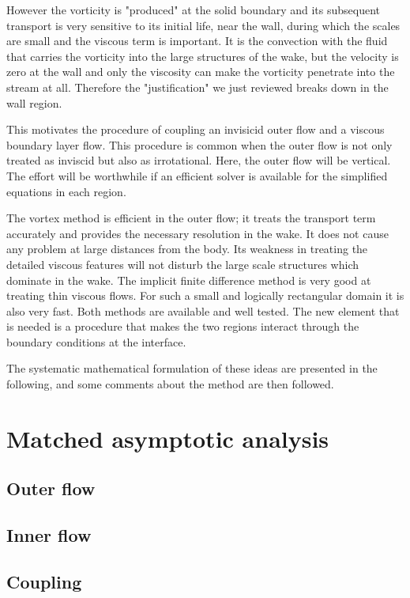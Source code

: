 However the vorticity is "produced" at the solid boundary and its subsequent transport is very sensitive to its initial life, near the wall, during which the scales are small and the viscous term is important.
It is the convection with the fluid that carries the vorticity into the large structures of the wake, but the velocity is zero at the wall and only the viscosity can make the vorticity penetrate into the stream at all.
Therefore the "justification" we just reviewed breaks down in the wall region.

This motivates the procedure of coupling an invisicid outer flow and a viscous boundary layer flow.
This procedure is common when the outer flow is not only treated as inviscid but also as irrotational.
Here, the outer flow will be vertical.
The effort will be worthwhile if an efficient solver is available for the simplified equations in each region.

The vortex method is efficient in the outer flow; it treats the transport term accurately and provides the necessary resolution in the wake.
It does not cause any problem at large distances from the body.
Its weakness in treating the detailed viscous features will not disturb the large scale structures which dominate in the wake.
The implicit finite difference method is very good at treating thin viscous flows.
For such a small and logically rectangular domain it is also very fast.
Both methods are available and well tested.
The new element that is needed is a procedure that makes the two regions interact through the boundary conditions at the interface.

The systematic mathematical formulation of these ideas are presented in the following, and some comments about the method are then followed.

\section{Matched asymptotic analysis}

\subsection{Outer flow}
\subsection{Inner flow}
\subsection{Coupling}


